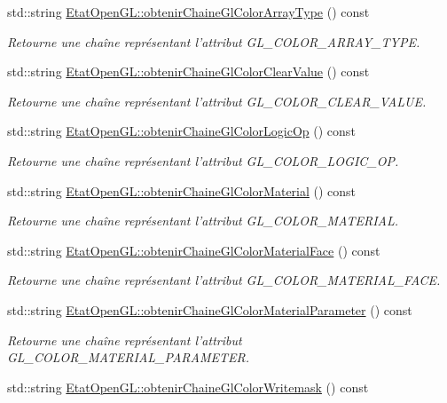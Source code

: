 \begin{DoxyCompactItemize}
std\-::string \hyperlink{group__utilitaire_gae77f9acd8bdebe2e7bb39660e03b3e28}{Etat\-Open\-G\-L\-::obtenir\-Chaine\-Gl\-Color\-Array\-Type} () const 
\begin{DoxyCompactList}\small\item\em Retourne une chaîne représentant l'attribut G\-L\-\_\-\-C\-O\-L\-O\-R\-\_\-\-A\-R\-R\-A\-Y\-\_\-\-T\-Y\-P\-E. \end{DoxyCompactList}\item 
std\-::string \hyperlink{group__utilitaire_ga7de74c129bd5c5038e7f3d03a5508f72}{Etat\-Open\-G\-L\-::obtenir\-Chaine\-Gl\-Color\-Clear\-Value} () const 
\begin{DoxyCompactList}\small\item\em Retourne une chaîne représentant l'attribut G\-L\-\_\-\-C\-O\-L\-O\-R\-\_\-\-C\-L\-E\-A\-R\-\_\-\-V\-A\-L\-U\-E. \end{DoxyCompactList}\item 
std\-::string \hyperlink{group__utilitaire_gac48e5f8e10bfcd96670a537164a0a8ff}{Etat\-Open\-G\-L\-::obtenir\-Chaine\-Gl\-Color\-Logic\-Op} () const 
\begin{DoxyCompactList}\small\item\em Retourne une chaîne représentant l'attribut G\-L\-\_\-\-C\-O\-L\-O\-R\-\_\-\-L\-O\-G\-I\-C\-\_\-\-O\-P. \end{DoxyCompactList}\item 
std\-::string \hyperlink{group__utilitaire_gae53c823bf9d4e4305baf00f4d7da96af}{Etat\-Open\-G\-L\-::obtenir\-Chaine\-Gl\-Color\-Material} () const 
\begin{DoxyCompactList}\small\item\em Retourne une chaîne représentant l'attribut G\-L\-\_\-\-C\-O\-L\-O\-R\-\_\-\-M\-A\-T\-E\-R\-I\-A\-L. \end{DoxyCompactList}\item 
std\-::string \hyperlink{group__utilitaire_gaec66f0ae860a11d50b0e1cf2def483bf}{Etat\-Open\-G\-L\-::obtenir\-Chaine\-Gl\-Color\-Material\-Face} () const 
\begin{DoxyCompactList}\small\item\em Retourne une chaîne représentant l'attribut G\-L\-\_\-\-C\-O\-L\-O\-R\-\_\-\-M\-A\-T\-E\-R\-I\-A\-L\-\_\-\-F\-A\-C\-E. \end{DoxyCompactList}\item 
std\-::string \hyperlink{group__utilitaire_gad2b7f4282f94a24c4b5129854732c36a}{Etat\-Open\-G\-L\-::obtenir\-Chaine\-Gl\-Color\-Material\-Parameter} () const 
\begin{DoxyCompactList}\small\item\em Retourne une chaîne représentant l'attribut G\-L\-\_\-\-C\-O\-L\-O\-R\-\_\-\-M\-A\-T\-E\-R\-I\-A\-L\-\_\-\-P\-A\-R\-A\-M\-E\-T\-E\-R. \end{DoxyCompactList}\item 
\hypertarget{group__utilitaire_ga677eb5add1db0999f73a7c6febefe4d8}{std\-::string \hyperlink{group__utilitaire_ga677eb5add1db0999f73a7c6febefe4d8}{Etat\-Open\-G\-L\-::obtenir\-Chaine\-Gl\-Color\-Writemask} () const }\label{group__utilitaire_ga677eb5add1db0999f73a7c6febefe4d8}


\end{DoxyCompactItemize}
